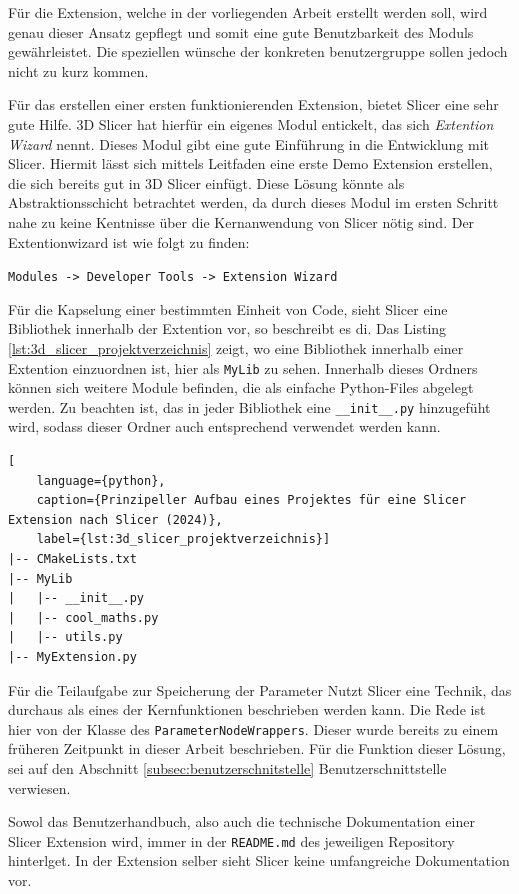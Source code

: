 Für die Extension, welche in der vorliegenden Arbeit erstellt werden soll, wird genau
dieser Ansatz gepflegt und somit eine gute Benutzbarkeit des Moduls gewährleistet.
Die speziellen wünsche der konkreten benutzergruppe sollen jedoch nicht zu kurz
kommen.

Für das erstellen einer ersten funktionierenden Extension, bietet Slicer eine sehr
gute Hilfe. 3D Slicer hat hierfür ein eigenes Modul entickelt, das sich \textit{Extention
Wizard} nennt. Dieses Modul gibt eine gute Einführung in die Entwicklung mit Slicer.
Hiermit lässt sich mittels Leitfaden eine erste Demo Extension erstellen, die sich
bereits gut in 3D Slicer einfügt. Diese Lösung könnte als Abstraktionsschicht
betrachtet werden, da durch dieses Modul im ersten Schritt nahe zu keine Kentnisse
über die Kernanwendung von Slicer nötig sind. Der Extentionwizard ist wie folgt
zu finden:

\texttt{Modules -> Developer Tools -> Extension Wizard}

Für die Kapselung einer bestimmten Einheit von Code, sieht Slicer eine Bibliothek
innerhalb der Extention vor, so beschreibt es di\citet{slicer2024}. Das Listing \ref{lst:3d_slicer_projektverzeichnis}
zeigt, wo eine Bibliothek innerhalb einer Extention einzuordnen ist, hier als \texttt{MyLib}
zu sehen. Innerhalb dieses Ordners können sich weitere Module befinden, die als
einfache Python-Files abgelegt werden. Zu beachten ist, das in jeder Bibliothek
eine \texttt{\_\_init\_\_.py} hinzugefüht wird, sodass dieser Ordner auch
entsprechend verwendet werden kann.

\begin{lstlisting}[
    language={python},
    caption={Prinzipeller Aufbau eines Projektes für eine Slicer Extension nach Slicer (2024)},
    label={lst:3d_slicer_projektverzeichnis}]
|-- CMakeLists.txt
|-- MyLib
|   |-- __init__.py
|   |-- cool_maths.py
|   |-- utils.py
|-- MyExtension.py
\end{lstlisting}

Für die Teilaufgabe zur Speicherung der Parameter Nutzt Slicer eine Technik, das
durchaus als eines der Kernfunktionen beschrieben werden kann. Die Rede ist hier
von der Klasse des \texttt{ParameterNodeWrappers}. Dieser wurde bereits zu einem
früheren Zeitpunkt in dieser Arbeit beschrieben. Für die Funktion dieser Lösung,
sei auf den Abschnitt \ref{subsec:benutzerschnitstelle} Benutzerschnittstelle verwiesen.

Sowol das Benutzerhandbuch, also auch die technische Dokumentation einer Slicer Extension
wird, immer in der \texttt{README.md} des jeweiligen Repository hinterlget. In der Extension
selber sieht Slicer keine umfangreiche Dokumentation vor.

